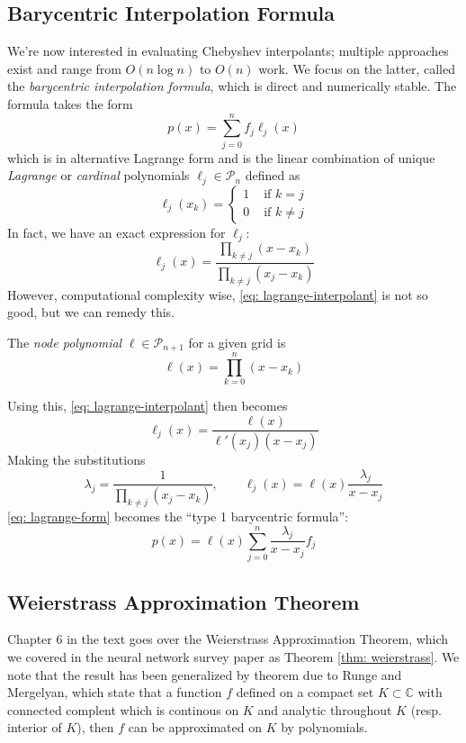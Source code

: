 \subsection{Barycentric Interpolation Formula}
We're now interested in evaluating Chebyshev interpolants; multiple approaches exist and range from $O(n\log n)$ to $O(n)$ work. We focus on the latter, called the \emph{barycentric interpolation formula}, which is direct and numerically stable. The formula takes the form 
\begin{equation}
  p(x) = \displaystyle\sum_{j=0}^{n}f_j\ell_j(x)
  \label{eq: lagrange-form}
\end{equation}
which is in alternative Lagrange form and is the linear combination of unique \emph{Lagrange} or \emph{cardinal} polynomials $\ell_j \in \mathcal{P}_n$ defined as 
\[ \ell_j(x_k) = \begin{cases}
  1 &\text{ if } k=j\\
  0 &\text{ if } k \not=j
\end{cases}\]
In fact, we have an exact expression for $\ell_j$:
\begin{equation}
  \ell_j(x) = \displaystyle\frac{\prod_{k \not= j}(x- x_k)}{\prod_{k\not=j} (x_j - x_k) }
  \label{eq: lagrange-interpolant}
\end{equation}
However, computational complexity wise, \eqref{eq: lagrange-interpolant} is not so good, but we can remedy this. 
\begin{dfn}
  The \emph{node polynomial} $\ell \in \mathcal{P}_{n+1}$ for a given grid is
  \[ \ell(x) = \prod_{k=0}^n (x - x_k)\]
\end{dfn}
Using this, \eqref{eq: lagrange-interpolant} then becomes
\[ \ell_j(x) = \frac{\ell(x)}{\ell'(x_j)(x - x_j)}\]
Making the substitutions
\[ \lambda_j = \frac{1}{\prod_{k\not=j} (x_j - x_k)}, \qquad \ell_j(x) = \ell(x)\frac{\lambda_j}{x-x_j}\]
\eqref{eq: lagrange-form} becomes the ``type 1 barycentric formula'':
\[ p(x) = \ell(x) \sum_{j=0}^n \frac{\lambda_j}{x - x_j}f_j\]

\subsection{Weierstrass Approximation Theorem}
Chapter 6 in the text goes over the Weierstrass Approximation Theorem, which we covered in the neural network survey paper as Theorem \ref{thm: weierstrass}. We note that the result has been generalized by theorem due to Runge and Mergelyan, which state that a function $f$ defined on a compact set $K \subset \mathbb{C}$ with connected complent which is continous on $K$ and analytic throughout $K$ (resp. interior of $K$), then $f$ can be approximated on $K$ by polynomials.
